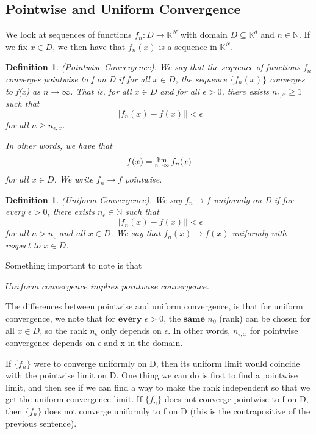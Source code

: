\documentclass[twoside]{article}
\newcommand{\Lim}[1]{\raisebox{0.5ex}{\scalebox{0.8}{$\displaystyle \lim_{#1}\;$}}}
\newtheorem{definition}[theorem]{Definition}
\begin{document}
\subsection{Pointwise and Uniform Convergence}

We look at sequences of functions
$
f_n: D \rightarrow \mathbb{K}^N
$
with domain $D \subseteq \mathbb{K}^d$ and $n \in \mathbb{N}$. If we fix $x \in D$, we then have that $f_n(x)$ is a sequence in $\mathbb{K}^N$.

\begin{definition}(Pointwise Convergence). We say that the sequence of functions $f_n$ converges pointwise to f on D if for all $x \in D$, the sequence $\{f_n(x)\}$ converges to f(x) as $n \rightarrow \infty$. That is, for all $x \in D$ and for all $\epsilon > 0$, there exists $n_{\epsilon,x} \geq 1$ such that
$$
||f_n(x) - f(x)|| < \epsilon
$$
for all $n \geq n_{\epsilon,x}$.

In other words, we have that
$$
f(x) = \Lim{n \rightarrow \infty}f_n(x)
$$
for all $x \in D$. We write $f_n \rightarrow f$ pointwise.
\end{definition}

\begin{definition}(Uniform Convergence). We say $f_n \rightarrow f$ uniformly on D if for every $\epsilon > 0$, there exists $n_{\epsilon} \in \mathbb{N}$ such that
$$
||f_n(x) - f(x)|| < \epsilon
$$
for all $n > n_{\epsilon}$ and all $x \in D$. We say that $f_n(x) \rightarrow f(x)$ uniformly with respect to $x \in D$.
\end{definition}

Something important to note is that
\begin{center}
$\textit{Uniform convergence implies pointwise convergence.}$
\end{center}

The differences between pointwise and uniform convergence, is that for uniform convergence, we note that for $\textbf{every } \epsilon > 0$, the $\textbf{same } n_0$ (rank) can be chosen for all $x \in D$, so the rank $n_{\epsilon}$ only depends on $\epsilon$. In other words, $n_{\epsilon,x}$ for pointwise convergence depends on $\epsilon$ and x in the domain.


If $\{f_n\}$ were to converge uniformly on D, then its uniform limit would coincide with the pointwise limit on D. One thing we can do is first to find a pointwise limit, and then see if we can find a way to make the rank independent so that we get the uniform convergence limit. If $\{f_n\}$ does not converge pointwise to f on D, then $\{f_n\}$ does not converge uniformly to f on D (this is the contrapositive of the previous sentence). 
\end{document}
